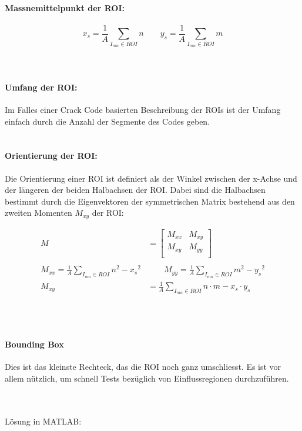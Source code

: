 \paragraph{Massnemittelpunkt der ROI:}
\[
	x_s = \frac{1}{A} \sum_{I_{mn}\in ROI}n \qquad y_s = \frac{1}{A} \sum_{I_{mn}\in ROI}m
\]
~\\\\
\paragraph{Umfang der ROI:\\}
Im Falles einer Crack Code basierten Beschreibung der ROIs ist der Umfang einfach durch die Anzahl der Segmente des Codes geben.\\
\\
\paragraph{Orientierung der ROI:\\}
Die Orientierung einer ROI ist definiert als der Winkel zwischen der x-Achse und der längeren der beiden Halbachsen der ROI.
Dabei sind die Halbachsen bestimmt durch die Eigenvektoren der symmetrischen Matrix bestehend aus den zweiten Momenten $M_{xy}$  der ROI:
\begin{scriptsize}\[\begin{aligned}
	M &= \left[\begin{matrix}
	 M_{xx} & M_{xy}\\
	 M_{xy} & M_{yy}\\
	\end{matrix}\right]\\\\
	M_{xx} = \frac{1}{A}\sum_{I_{mn}\in ROI}n^2-{x_s}^2& \qquad
	M_{yy} = \frac{1}{A}\sum_{I_{mn}\in ROI}m^2-{y_s}^2 \\
	M_{xy} &= \frac{1}{A}\sum_{I_{mn}\in ROI}n \cdot m-x_s \cdot y_s
\end{aligned}\]\end{scriptsize}
~\\\\
\paragraph{Bounding Box\\}
Dies ist das kleinste Rechteck, das die ROI noch ganz umschliesst. 
Es ist vor allem nützlich, um schnell Tests bezüglich von Einflussregionen durchzuführen.

~\\\\
Lösung in MATLAB:
\lstset{language=Matlab}

~\\